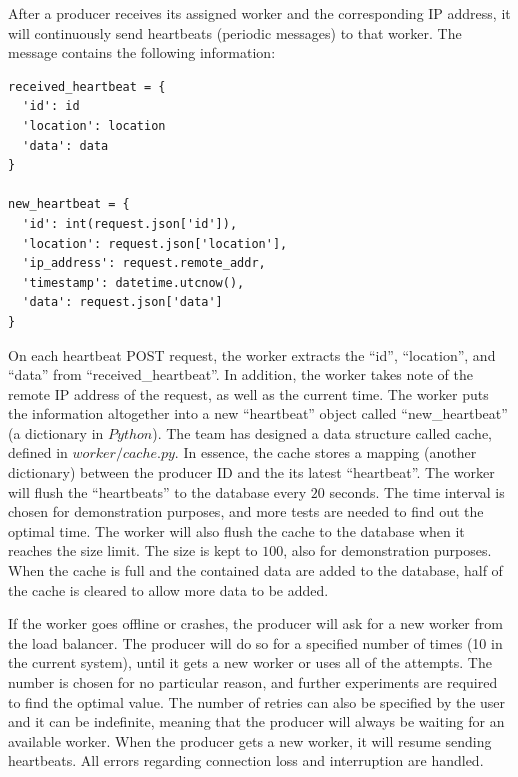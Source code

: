 \documentclass{sigchi}
\begin{document}
After a producer receives its assigned worker and the corresponding IP address, it will continuously send heartbeats (periodic messages) to that worker. The message contains the following information:

\vspace*{\baselineskip}
\begin{lstlisting}[caption={Heartbeat format}, mathescape, upquote=true]
received_heartbeat = {
  'id': id
  'location': location
  'data': data
}

new_heartbeat = {
  'id': int(request.json['id']),
  'location': request.json['location'],
  'ip_address': request.remote_addr,
  'timestamp': datetime.utcnow(),
  'data': request.json['data']
}
\end{lstlisting}

On each heartbeat POST request, the worker extracts the \enquote{id}, \enquote{location}, and \enquote{data} from \enquote{received\_heartbeat}. In addition, the worker takes note of the remote IP address of the request, as well as the current time. The worker puts the information altogether into a new \enquote{heartbeat} object called \enquote{new\_heartbeat} (a dictionary in $Python$). The team has designed a data structure called cache, defined in $worker/cache.py$. In essence, the cache stores a mapping (another dictionary) between the producer ID and the its latest \enquote{heartbeat}. The worker will flush the \enquote{heartbeats} to the database every $20$ seconds. The time interval is chosen for demonstration purposes, and more tests are needed to find out the optimal time. The worker will also flush the cache to the database when it reaches the size limit. The size is kept to $100$, also for demonstration purposes. When the cache is full and the contained data are added to the database, half of the cache is cleared to allow more data to be added.

If the worker goes offline or crashes, the producer will ask for a new worker from the load balancer. The producer will do so for a specified number of times (10 in the current system), until it gets a new worker or uses all of the attempts. The number is chosen for no particular reason, and further experiments are required to find the optimal value. The number of retries can also be specified by the user and it can be indefinite, meaning that the producer will always be waiting for an available worker. When the producer gets a new worker, it will resume sending heartbeats. All errors regarding connection loss and interruption are handled.
\end{document}
